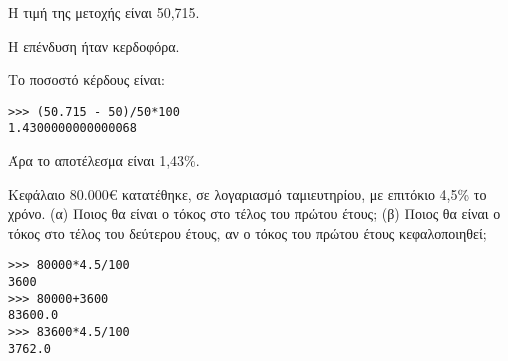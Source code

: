 Η τιμή της μετοχής είναι 50,715.

Η επένδυση ήταν κερδοφόρα.

Το ποσοστό κέρδους είναι:
\begin{lstlisting}
>>> (50.715 - 50)/50*100
1.4300000000000068
\end{lstlisting}

Άρα το αποτέλεσμα είναι 1,43\%.

\begin{exercise}
Κεφάλαιο 80.000€ κατατέθηκε, σε λογαριασμό ταμιευτηρίου, με επιτόκιο 4,5\% το χρόνο.
(α) Ποιος θα είναι ο τόκος στο τέλος του πρώτου έτους; (β) Ποιος θα είναι ο τόκος
στο τέλος του δεύτερου έτους, αν ο τόκος του πρώτου έτους κεφαλοποιηθεί;
\end{exercise}

\begin{lstlisting}
>>> 80000*4.5/100
3600
>>> 80000+3600
83600.0
>>> 83600*4.5/100
3762.0
\end{lstlisting}
